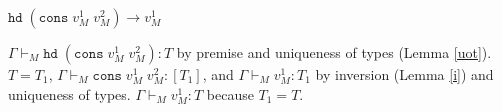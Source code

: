 \begin{case}
$\mathtt{hd}\;(\mathtt{cons}\;v_{M}^{1}\;v_{M}^{2})\rightarrow v_{M}^{1}$

$\Gamma\vdash_{M}\mathtt{hd}\;(\mathtt{cons}\;v_{M}^{1}\;v_{M}^{2}):T$ by premise and uniqueness of types (Lemma \ref{uot}).  $T=T_{1}$, $\Gamma\vdash_{M}\mathtt{cons}\;v_{M}^{1}\;v_{M}^{2}:[T_{1}]$, and $\Gamma\vdash_{M}v_{M}^{1}:T_{1}$ by inversion (Lemma \ref{i}) and uniqueness of types.  $\Gamma\vdash_{M}v_{M}^{1}:T$ because $T_{1}=T$.
\end{case}